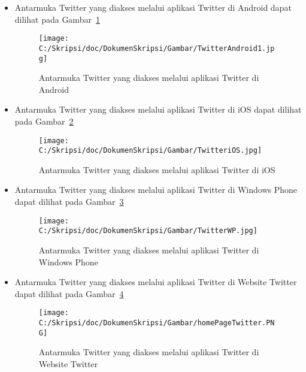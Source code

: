 \begin{itemize}
	\item Antarmuka Twitter yang diakses melalui aplikasi Twitter di Android dapat dilihat pada Gambar~\ref{fig:TwitterAndroid}
			
			\begin{figure}[htbp]
				\centering
					\texttt{[image: C:/Skripsi/doc/DokumenSkripsi/Gambar/TwitterAndroid1.jpg]}
				\caption{Antarmuka Twitter yang diakses melalui aplikasi Twitter di Android}
				\label{fig:TwitterAndroid}
			\end{figure}
			
	\item Antarmuka Twitter yang diakses melalui aplikasi Twitter di iOS dapat dilihat pada Gambar~\ref{fig:TwitteriOS}
	
	
	\begin{figure}[htbp]
		\centering
			\texttt{[image: C:/Skripsi/doc/DokumenSkripsi/Gambar/TwitteriOS.jpg]}
		\caption{Antarmuka Twitter yang diakses melalui aplikasi Twitter di iOS}
		\label{fig:TwitteriOS}
	\end{figure}
	
	\item Antarmuka Twitter yang diakses melalui aplikasi Twitter di Windows Phone dapat dilihat pada Gambar~\ref{fig:TwitterWP}
	
	
	\begin{figure}[htbp]
		\centering
			\texttt{[image: C:/Skripsi/doc/DokumenSkripsi/Gambar/TwitterWP.jpg]}
		\caption{Antarmuka Twitter yang diakses melalui aplikasi Twitter di Windows Phone}
		\label{fig:TwitterWP}
	\end{figure}
	
	
	\item Antarmuka Twitter yang diakses melalui aplikasi Twitter di Website Twitter dapat dilihat pada Gambar~\ref{fig:homePageTwitter}

	
	\begin{figure}[htbp]
		\centering
			\texttt{[image: C:/Skripsi/doc/DokumenSkripsi/Gambar/homePageTwitter.PNG]}
		\caption{Antarmuka Twitter yang diakses melalui aplikasi Twitter di Website Twitter}
		\label{fig:homePageTwitter}
	\end{figure}
	
\end{itemize}

